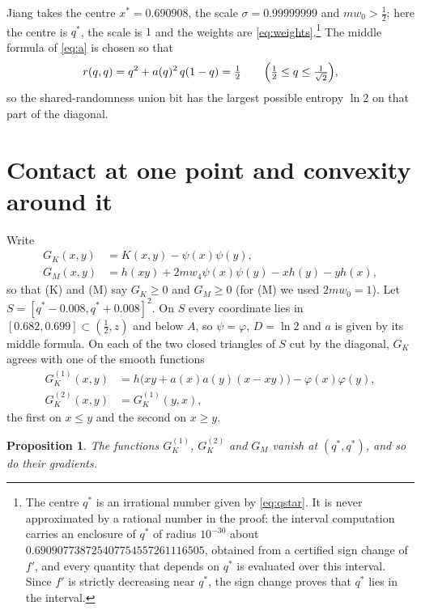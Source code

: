 \documentclass[aps,prd,twocolumn,superscriptaddress,nofootinbib,longbibliography,floatfix,amsmath,amssymb,10pt]{revtex4-2}
\theoremstyle{plain}
\newtheorem{proposition}[theorem]{Proposition}
\theoremstyle{definition}
\theoremstyle{plain}
\newcommand{\qs}{q^{*}}
\begin{document}
Jiang takes the centre $x^*=0.690908$, the scale $\sigma=0.99999999$ and $mw_0>\frac12$; here the centre is $\qs$, the scale is $1$ and the weights are \eqref{eq:weights}.\footnote{The centre $\qs$ is an irrational number given by \eqref{eq:qstar}. It is never approximated by a rational number in the proof: the interval computation carries an enclosure of $\qs$ of radius $10^{-30}$ about $0.690907738725407754557261116505$, obtained from a certified sign change of $f'$, and every quantity that depends on $\qs$ is evaluated over this interval. Since $f'$ is strictly decreasing near $\qs$, the sign change proves that $\qs$ lies in the interval.} The middle formula of \eqref{eq:a} is chosen so that
\begin{equation}\label{eq:rdiag}
r(q,q)=q^2+a(q)^2\,q(1-q)=\tfrac12\qquad\Bigl(\tfrac12\le q\le\tfrac{1}{\sqrt2}\Bigr),
\end{equation}
so the shared-randomness union bit has the largest possible entropy $\ln 2$ on that part of the diagonal.

\section{Contact at one point and convexity around it}\label{sec:tangency}

Write
\begin{align*}
G_K(x,y)&=K(x,y)-\psi(x)\psi(y),\\
G_M(x,y)&=h(xy)+2mw_4\psi(x)\psi(y)-xh(y)-yh(x),
\end{align*}
so that (K) and (M) say $G_K\ge 0$ and $G_M\ge 0$ (for (M) we used $2mw_0=1$). Let $S=[\qs-0.008,\qs+0.008]^2$. On $S$ every coordinate lies in $[0.682,0.699]\subset(\frac12,z)$ and below $A$, so $\psi=\varphi$, $D=\ln 2$ and $a$ is given by its middle formula. On each of the two closed triangles of $S$ cut by the diagonal, $G_K$ agrees with one of the smooth functions
\begin{align*}
G_K^{(1)}(x,y)&=h\bigl(xy+a(x)a(y)(x-xy)\bigr)-\varphi(x)\varphi(y),\\
G_K^{(2)}(x,y)&=G_K^{(1)}(y,x),
\end{align*}
the first on $x\le y$ and the second on $x\ge y$.

\begin{proposition}\label{prop:tangent}
The functions $G_K^{(1)}$, $G_K^{(2)}$ and $G_M$ vanish at $(\qs,\qs)$, and so do their gradients.
\end{proposition}
\end{document}

